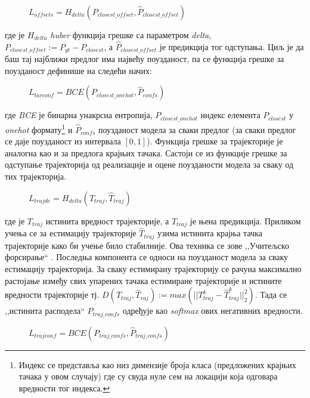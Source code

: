 \documentclass[11pt,oneside]{memoir}
\begin{document}
\begin{figure}[H]
  \centering
  $L_{offsets} = H_{delta}(P_{closest\_offset}, \hat{P}_{closest\_offset})$
\end{figure}

\noindent где је $H_{delta}$ \textit{huber} функција грешке са параметром \textit{delta}, $P_{closest\_offset} := P_{gt} - P_{closest}$,
а $\hat{P}_{closest\_offset}$ је предикција тог одступања. Циљ је да баш тај најближи предлог има највећу поузданост, па се функција грешке за 
поузданост дефинише на следећи начих:

\begin{figure}[H]
  \centering
  $L_{tarconf} = BCE(P_{closest\_onehot}, \hat{P}_{confs})$
\end{figure}

\noindent где \textit{BCE} је бинарна унакрсна ентропија, $P_{closest\_onehot}$ индекс елемента $P_{closest}$ у \textit{onehot} 
формату\footnote{Индекс се представља као низ димензије броја класа (предложених крајњих тачака у овом случају) где су свуда нуле сем на локацији која одговара
вредности тог индекса.} и $\hat{P}_{confs}$ поузданост модела за сваки предлог (за сваки предлог се даје поузданост из интервала $[0, 1]$). Функција грешке за
трајекторије је аналогна као и за предлога крајњих тачака. Састоји се из функције грешке за одступање трајекторија од реализације и оцене
поузданости модела за сваку од тих трајекторија.

\begin{figure}[H]
  \centering
  $L_{trajde} = H_{delta} (T_{traj}, \hat{T}_{traj})$
\end{figure}

\noindent где је $T_{traj}$ истинита вредност трајекторије, а $\hat{T}_{traj}$ је њена предикција. Приликом учења се за естимацију трајекторије 
$\hat{T}_{traj}$ узима истинита крајња тачка трајекторије како би учење било стабилније. Ова техника се зове ,,Учитељско форсирање`` \cite{teacher_forcing}.
Последња компонента се односи на поузданост модела за сваку естимацију трајекторија. За сваку естимирану трајекторију се рачуна максимално растојање 
између свих упарених тачака естимиране трајекторије и истините вредности трајекторије тј. 
$D(T_{traj}, \hat{T}_{raj}) := max(||T^{k}_{traj} - \hat{T}^{k}_{traj}||^{2}_{2})$. Тада се ,,истинита расподела`` $P_{traj\_confs}$ одређује као \textit{softmax} 
ових негативних вредности.

\begin{figure}[H]
  \centering
  $L_{trajconf} = BCE(P_{traj\_confs}, \hat{P}_{traj\_confs})$
\end{figure}
\end{document}
